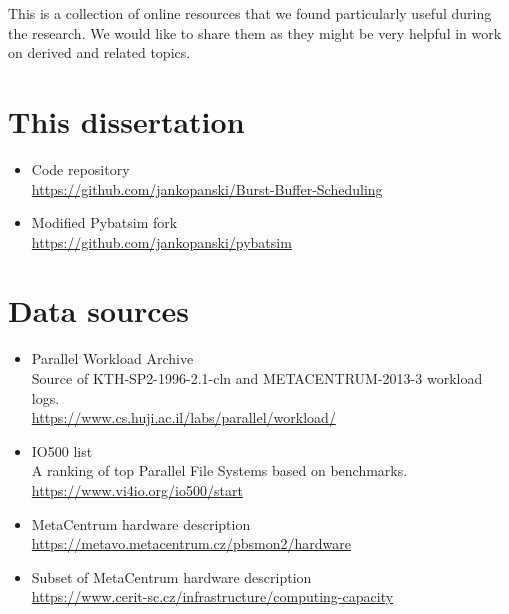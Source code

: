 \documentclass[thesis-en.tex]{subfiles}
\begin{document}
This is a collection of online resources that we found particularly useful during the research. We would like to share them as they might be very helpful in work on derived and related topics.

\renewcommand{\labelitemi}{$\square$}

\section{This dissertation}
\begin{itemize}
    \item Code repository\\
    \url{https://github.com/jankopanski/Burst-Buffer-Scheduling}
    \item Modified Pybatsim fork\\
    \url{https://github.com/jankopanski/pybatsim}
\end{itemize}

\section{Data sources}
\begin{itemize}
    \item Parallel Workload Archive\\
    Source of KTH-SP2-1996-2.1-cln and METACENTRUM-2013-3 workload logs.\\
    \url{https://www.cs.huji.ac.il/labs/parallel/workload/}
    \item IO500 list\\
    A ranking of top Parallel File Systems based on benchmarks.\\
    \url{https://www.vi4io.org/io500/start}
    \item MetaCentrum hardware description\\
    \url{https://metavo.metacentrum.cz/pbsmon2/hardware}
    \item Subset of MetaCentrum hardware description\\
    \url{https://www.cerit-sc.cz/infrastructure/computing-capacity}
\end{itemize}
\end{document}

